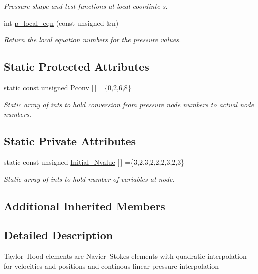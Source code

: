 \begin{DoxyCompactItemize}
\begin{DoxyCompactList}\small\item\em Pressure shape and test functions at local coordinte s. \end{DoxyCompactList}\item 
int \hyperlink{classoomph_1_1PolarTaylorHoodElement_ab50b43e4dadba14413f8b84b35eea9aa}{p\+\_\+local\+\_\+eqn} (const unsigned \&n)
\begin{DoxyCompactList}\small\item\em Return the local equation numbers for the pressure values. \end{DoxyCompactList}\end{DoxyCompactItemize}
\subsection*{Static Protected Attributes}
\begin{DoxyCompactItemize}
\item 
static const unsigned \hyperlink{classoomph_1_1PolarTaylorHoodElement_a4804e4bdf732b17cdb7e55aebaebcab0}{Pconv} \mbox{[}$\,$\mbox{]} =\{0,2,6,8\}
\begin{DoxyCompactList}\small\item\em Static array of ints to hold conversion from pressure node numbers to actual node numbers. \end{DoxyCompactList}\end{DoxyCompactItemize}
\subsection*{Static Private Attributes}
\begin{DoxyCompactItemize}
\item 
static const unsigned \hyperlink{classoomph_1_1PolarTaylorHoodElement_a4db1fda841168bbf5889e060b52f4344}{Initial\+\_\+\+Nvalue} \mbox{[}$\,$\mbox{]} =\{3,2,3,2,2,2,3,2,3\}
\begin{DoxyCompactList}\small\item\em Static array of ints to hold number of variables at node. \end{DoxyCompactList}\end{DoxyCompactItemize}
\subsection*{Additional Inherited Members}


\subsection{Detailed Description}
Taylor--Hood elements are Navier--Stokes elements with quadratic interpolation for velocities and positions and continous linear pressure interpolation 

